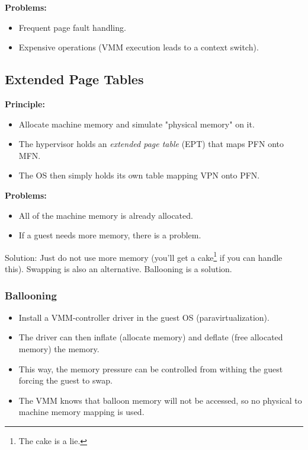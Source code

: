 \documentclass[a4paper, 11pt, accentcolor = tud3b]{tudreport}
\begin{document}
	            \textbf{Problems:}
		        \begin{itemize}
		        	\item Frequent page fault handling.
		        	\item Expensive operations (VMM execution leads to a context switch).
		        \end{itemize}

            \subsection{Extended Page Tables}
                \textbf{Principle:}
                \begin{itemize}
                	\item Allocate machine memory and simulate "physical memory" on it.
                	\item The hypervisor holds an \textit{extended page table} (EPT) that maps PFN onto MFN.
                	\item The OS then simply holds its own table mapping VPN onto PFN.
                \end{itemize}
            
	            \textbf{Problems:}
	            \begin{itemize}
	            	\item All of the machine memory is already allocated.
	            	\item If a guest needs more memory, there is a problem.
	            \end{itemize}
            
	            Solution: Just do not use more memory (you'll get a cake\footnote{The cake is a lie.} if you can handle this). Swapping is also an alternative. Ballooning is a solution.
	            
	            \subsubsection{Ballooning}
		            \begin{itemize}
		            	\item Install a VMM-controller driver in the guest OS (paravirtualization).
		            	\item The driver can then inflate (allocate memory) and deflate (free allocated memory) the memory.
		            	\item This way, the memory pressure can be controlled from withing the guest forcing the guest to swap.
		            	\item The VMM knows that balloon memory will not be accessed, so no physical to machine memory mapping is used.
		            \end{itemize}
\end{document}

